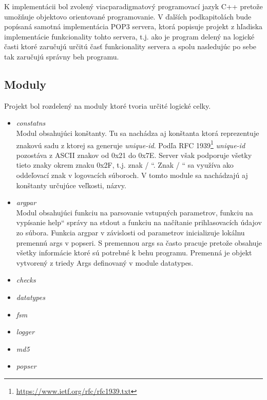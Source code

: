 \documentclass[11pt,a4paper]{article}
\providecommand{\uv}[1]{\quotedblbase #1\textquotedblleft}
\begin{document}
	K implementácii bol zvolený viacparadigmatový programovací jazyk C++ pretože umožňuje objektovo orientované programovanie. V ďalších podkapitolách bude popísaná samotná implementácia POP3 servera, ktorá popisuje projekt z hľadiska implementácie funkcionality tohto servera, t.j. ako je program delený na logické časti ktoré zaručujú určitú časť funkcionality servera a spolu nasledujúc po sebe tak zaručujú správny beh programu.

	\subsection{Moduly}
	Projekt bol rozdelený na moduly ktoré tvoria určité logické celky.
	\begin{itemize}

		\item \textit{constatns}\\[0.4em]
			Modul obsahujúci konštanty. Tu sa nachádza aj konštanta ktorá reprezentuje znakovú sadu z ktorej sa generuje \textit{unique-id}. Podľa RFC 1939\footnote{\url{https://www.ietf.org/rfc/rfc1939.txt}} \textit{unique-id} pozostáva z ASCII znakov od 0x21 do 0x7E. Server však podporuje všetky tieto znaky okrem znaku 0x2F, t.j. znak \uv{ / }. Znak \uv{ / } sa využíva ako oddeľovací znak v logovacích súboroch. V tomto module sa nachádzajú aj konštanty určujúce veľkosti, názvy.

		\item \textit{argpar}\\[0.4em]
			Modul obsahujúci funkciu na parsovanie vstupných parametrov, funkciu na vypísanie \uv{help} správy na stdout a funkciu na načítanie prihlasovacích údajov zo súbora. Funkcia argpar v závislosti od parametrov inicializuje lokálnu premennú args v popseri. S premennou args sa často pracuje pretože obsahuje všetky informácie ktoré sú potrebné k behu programu. Premenná je objekt vytvorený z triedy Args definovaný v module datatypes.

		\item \textit{checks}\\[0.4em]

		\item \textit{datatypes}\\[0.4em]

		\item \textit{fsm}\\[0.4em]

		\item \textit{logger}\\[0.4em]

		\item \textit{md5}\\[0.4em]

		\item \textit{popser}\\[0.4em]
	\end{itemize}
\end{document}
